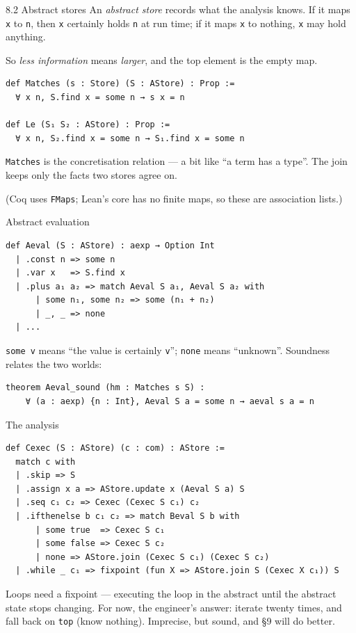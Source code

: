 \documentclass[aspectratio=169,10pt]{beamer}
\newcommand{\code}[1]{\texttt{\small #1}}
\begin{document}
\begin{frame}[fragile]{8.2 Abstract stores}
An \emph{abstract store} records what the analysis knows.  If it maps
\code{x} to \code{n}, then \code{x} certainly holds \code{n} at run time; if
it maps \code{x} to nothing, \code{x} may hold anything.
\medskip

So \emph{less information} means \emph{larger}, and the top element is the
empty map.
\begin{lstlisting}
def Matches (s : Store) (S : AStore) : Prop :=
  ∀ x n, S.find x = some n → s x = n

def Le (S₁ S₂ : AStore) : Prop :=
  ∀ x n, S₂.find x = some n → S₁.find x = some n
\end{lstlisting}
\code{Matches} is the concretisation relation --- a bit like ``a term has a
type''.  The join keeps only the facts two stores agree on.
\medskip

{\small (Coq uses \code{FMaps}; Lean's core has no finite maps, so these are
association lists.)}
\end{frame}

\begin{frame}[fragile]{Abstract evaluation}
\begin{lstlisting}
def Aeval (S : AStore) : aexp → Option Int
  | .const n => some n
  | .var x   => S.find x
  | .plus a₁ a₂ => match Aeval S a₁, Aeval S a₂ with
      | some n₁, some n₂ => some (n₁ + n₂)
      | _, _ => none
  | ...
\end{lstlisting}
\code{some v} means ``the value is certainly \code{v}''; \code{none} means
``unknown''.  Soundness relates the two worlds:
\begin{lstlisting}
theorem Aeval_sound (hm : Matches s S) :
    ∀ (a : aexp) {n : Int}, Aeval S a = some n → aeval s a = n
\end{lstlisting}
\end{frame}

\begin{frame}[fragile]{The analysis}
\begin{lstlisting}
def Cexec (S : AStore) (c : com) : AStore :=
  match c with
  | .skip => S
  | .assign x a => AStore.update x (Aeval S a) S
  | .seq c₁ c₂ => Cexec (Cexec S c₁) c₂
  | .ifthenelse b c₁ c₂ => match Beval S b with
      | some true  => Cexec S c₁
      | some false => Cexec S c₂
      | none => AStore.join (Cexec S c₁) (Cexec S c₂)
  | .while _ c₁ => fixpoint (fun X => AStore.join S (Cexec X c₁)) S
\end{lstlisting}
Loops need a fixpoint --- executing the loop in the abstract until the
abstract state stops changing.  For now, the engineer's answer: iterate
twenty times, and fall back on \code{top} (know nothing).  Imprecise, but
sound, and \S9 will do better.
\end{frame}
\end{document}
